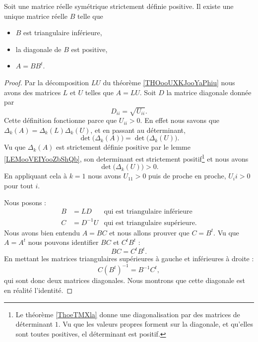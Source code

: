 \begin{theorem}
    Soit une matrice réelle symétrique strictement définie positive. Il existe une unique matrice réelle \( B\) telle que
    \begin{itemize}
        \item \( B\) est triangulaire inférieure,
        \item la diagonale de \( B\) est positive,
        \item \( A=BB^t\).
    \end{itemize}
\end{theorem}

\begin{proof}
    Par la décomposition \( LU\) du théorème \ref{THOooUXKJooYaPhiu} nous avons des matrices \( L\) et \( U\) telles que \( A=LU\). Soit \( D\) la matrice diagonale donnée par 
    \begin{equation}
        D_{ii}=\sqrt{ U_{ii} }.
    \end{equation}
    Cette définition fonctionne parce que \( U_{ii}>0\). En effet nous savons que \( \Delta_k(A)=\Delta_k(L)\Delta_k(U)\), et en passant au déterminant, 
    \begin{equation}
        \det\big( \Delta_k(A) \big)=\det\big( \Delta_k(U) \big).
    \end{equation}
    Vu que \( \Delta_k(A)\) est strictement définie positive par le lemme \ref{LEMooVEIYooZbShQb}, son determinant est strictement positif\footnote{Le théorème \ref{ThoeTMXla} donne une diagonalisation par des matrices de déterminant \( 1\). Vu que les valeurs propres forment sur la diagonale, et qu'elles sont toutes positives, el déterminant est positif.} et nous avons
    \begin{equation}
        \det\big( \Delta_k(U) \big)>0.
    \end{equation}
    En appliquant cela à \( k=1\) nous avons \( U_{11}>0\) puis de proche en proche, \( U_ii>0\) pour tout \( i\).

    Nous posons :
    \begin{subequations}
        \begin{align}
            B&=LD&\text{qui est triangulaire inférieure}\\
            C&=D^{-1} U&\text{qui est triangulaire supérieure.}
        \end{align}
    \end{subequations}
    Nous avons bien entendu \( A=BC\) et nous allons prouver que \( C=B^t\). Vu que \( A=A^t\) nous pouvons identifier \( BC\) et \( C^tB^t\) :
    \begin{equation}
        BC=C^tB^t.
    \end{equation}
    En mettant les matrices triangulaires supérieures à gauche et inférieures à droite :
    \begin{equation}
        C(B^t)^{-1}=B^{-1}C^t,
    \end{equation}
    qui sont donc deux matrices diagonales. Nous montrons que cette diagonale est en réalité l'identité.


\end{proof}
